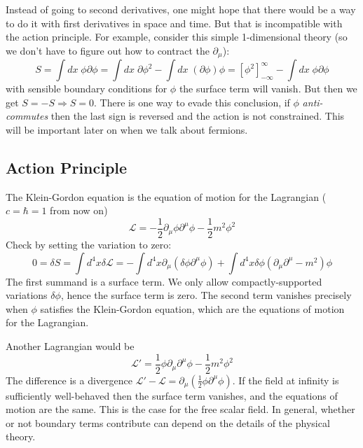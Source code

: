 \documentclass[12pt]{article}
\begin{document}
Instead of going to second derivatives, one might hope that there
would be a way to do it with first derivatives in space and time. But
that is incompatible with the action principle. For example, consider
this simple 1-dimensional theory (so we don't have to figure out how
to contract the $\partial_\mu$):
\begin{equation}
  S = \int dx \; \phi \partial \phi
  = \int dx \; \partial\phi^2 - \int dx \; (\partial \phi) \phi
  = [\phi^2]_{-\infty}^\infty - \int dx \; \phi \partial \phi
\end{equation}
with sensible boundary conditions for $\phi$ the surface term will
vanish. But then we get $S=-S \Rightarrow S=0$. There is one way to
evade this conclusion, if $\phi$ \emph{anti-commutes} then the last
sign is reversed and the action is not constrained. This will be
important later on when we talk about fermions.


\subsection{Action Principle}

The Klein-Gordon equation is the equation of motion for the Lagrangian
($c=\hbar=1$ from now on)
\begin{equation}
  \mathcal{L} = -\frac{1}{2} 
  \partial_\mu \phi \partial^\mu \phi
  - \frac{1}{2} m^2 \phi^2
\end{equation}
Check by setting the variation to zero:
\begin{equation}
  0 = \delta S = \int d^4x \delta\mathcal{L} =
  -\int d^4x \partial_\mu (\delta \phi \partial^\mu \phi)
  + \int d^4x \delta \phi (\partial_\mu \partial^\mu - m^2) \phi
\end{equation}
The first summand is a surface term. We only allow compactly-supported
variations $\delta \phi$, hence the surface term is zero. The second
term vanishes precisely when $\phi$ satisfies the Klein-Gordon
equation, which are the equations of motion for the Lagrangian.

Another Lagrangian would be 
\begin{equation}
  \mathcal{L}' = \frac{1}{2} \phi \partial_\mu \partial^\mu \phi
  - \frac{1}{2}m^2\phi^2
\end{equation}
The difference is a divergence
$\mathcal{L}'-\mathcal{L}=\partial_\mu(\frac{1}{2}\phi\partial^\mu
\phi)$. If the field at infinity is sufficiently well-behaved then the
surface term vanishes, and the equations of motion are the same. This
is the case for the free scalar field. In general, whether or not
boundary terms contribute can depend on the details of the physical
theory.
\end{document}
